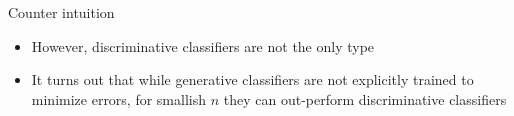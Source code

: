 \documentclass{beamer}
\begin{document}
\begin{frame}{Counter intuition}
\begin{itemize}
\item However, discriminative classifiers are not the only type
\item It turns out that while generative classifiers are not explicitly trained to minimize errors, for smallish $n$ they can out-perform discriminative classifiers
\end{itemize}
\end{frame}
\end{document}
